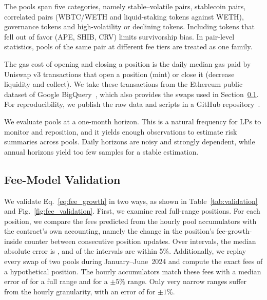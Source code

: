\documentclass[10pt,conference,compsocconf]{IEEEtran}
\begin{document}
The pools span five categories, namely stable--volatile pairs, stablecoin pairs, correlated pairs (WBTC/WETH and liquid-staking tokens against WETH), governance tokens and high-volatility or declining tokens. Including tokens that fell out of favor (APE, SHIB, CRV) limits survivorship bias. In pair-level statistics, pools of the same pair at different fee tiers are treated as one family.

The gas cost of opening and closing a position is the daily median gas paid by Uniswap v3 transactions that open a position (mint) or close it (decrease liquidity and collect). We take these transactions from the Ethereum public dataset of Google BigQuery~\cite{bigquery_ethereum}, which also provides the swaps used in Section~\ref{subsec:fee_validation}. For reproducibility, we publish the raw data and scripts in a GitHub repository~\cite{mitigation_code}.

We evaluate pools at a one-month horizon. This is a natural frequency for LPs to monitor and reposition, and it yields enough observations to estimate risk summaries across pools. Daily horizons are noisy and strongly dependent, while annual horizons yield too few samples for a stable estimation.

\subsection{Fee-Model Validation}
\label{subsec:fee_validation}
We validate Eq.~\eqref{eq:fee_growth} in two ways, as shown in Table~\ref{tab:validation} and Fig.~\ref{fig:fee_validation}. First, we examine \FeePositions{} real full-range positions. For each position, we compare the fees predicted from the hourly pool accumulators with the contract's own accounting, namely the change in the position's fee-growth-inside counter between consecutive position updates. Over \FeeIntervals{} intervals, the median absolute error is \FeeMedianErr{}, and \FeeWithinFive{} of the intervals are within 5\%. Additionally, we replay every swap of two pools during January--June~2024 and compute the exact fees of a hypothetical position. The hourly accumulators match these fees with a median error of \SwapErrFull{} for a full range and \SwapErrFive{} for a $\pm5\%$ range. Only very narrow ranges suffer from the hourly granularity, with an error of \SwapErrOne{} for $\pm1\%$.

\begin{table}[t]
\centering
\scriptsize
\setlength{\tabcolsep}{3pt}

\caption{Fee-model validation, showing the absolute relative error (\%) of the hourly fee-growth model against real positions and exact swap replays.}
\label{tab:validation}
\end{table}
\end{document}
